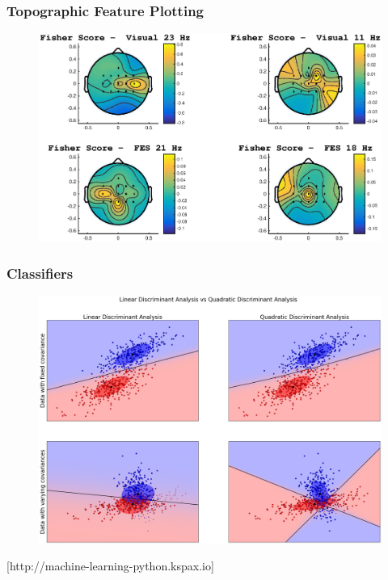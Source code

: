 \documentclass{beamer}
\begin{document}
\begin{frame} %
\frametitle{Topographic Feature Plotting}
\begin{figure}
	\includegraphics[width=0.95\linewidth]{fig/fishertopo.eps}
\end{figure}
\end{frame}


\begin{frame}
\frametitle{Classifiers }
\begin{figure}
	\includegraphics[width=0.75\linewidth]{fig/qdalda.png}
\end{figure}
[http://machine-learning-python.kspax.io]
\end{frame}

\end{document}
